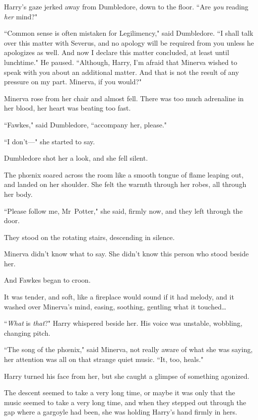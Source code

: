 Harry's gaze jerked away from Dumbledore, down to the floor. ``Are \emph{you} reading \emph{her} mind?"

``Common sense is often mistaken for Legilimency," said Dumbledore. ``I shall talk over this matter with Severus, and no apology will be required from you unless he apologizes as well. And now I declare this matter concluded, at least until lunchtime." He paused. ``Although, Harry, I'm afraid that Minerva wished to speak with you about an additional matter. And that is not the result of any pressure on my part. Minerva, if you would?"

Minerva rose from her chair and almost fell. There was too much adrenaline in her blood, her heart was beating too fast.

``Fawkes," said Dumbledore, ``accompany her, please."

``I don't—" she started to say.

Dumbledore shot her a look, and she fell silent.

The phœnix soared across the room like a smooth tongue of flame leaping out, and landed on her shoulder. She felt the warmth through her robes, all through her body.

``Please follow me, Mr~Potter," she said, firmly now, and they left through the door.

\later

They stood on the rotating stairs, descending in silence.

Minerva didn't know what to say. She didn't know this person who stood beside her.

And Fawkes began to croon.

It was tender, and soft, like a fireplace would sound if it had melody, and it washed over Minerva's mind, easing, soothing, gentling what it touched{\ldots}

``\emph{What} is \emph{that}?" Harry whispered beside her. His voice was unstable, wobbling, changing pitch.

``The song of the phœnix," said Minerva, not really aware of what she was saying, her attention was all on that strange quiet music. ``It, too, heals."

Harry turned his face from her, but she caught a glimpse of something agonized.

The descent seemed to take a very long time, or maybe it was only that the music seemed to take a very long time, and when they stepped out through the gap where a gargoyle had been, she was holding Harry's hand firmly in hers.

